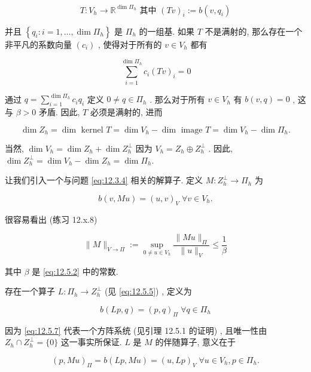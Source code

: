 $$
T : {V}_{h} \rightarrow  {\mathbb{R}}^{\dim {\varPi }_{h}}\text{ 其中 }{\left( Tv\right) }_{i}:=b\left( {v,{q}_{i}}\right)
$$

并且 $\left\{  {{q}_{i} : i = 1,\ldots ,\dim {\varPi }_{h}}\right\}$ 是 ${\varPi }_{h}$ 的一组基. 如果 $T$ 不是满射的, 那么存在一个非平凡的系数向量 $\left( {c}_{i}\right)$ , 使得对于所有的 $v \in  {V}_{h}$ 都有

$$
\sum\limits_{{i = 1}}^{{\dim {\varPi }_{h}}}{c}_{i}{\left( Tv\right) }_{i} = 0
$$

通过 $q = \sum\limits_{{i = 1}}^{{\dim {\varPi }_{h}}}{c}_{i}{q}_{i}$ 定义 $0 \neq  q \in  {\varPi }_{h}$ . 那么对于所有 $v \in  {V}_{h}$ 有 $b\left( {v,q}\right)  = 0$ , 这与 $\beta  > 0$ 矛盾. 因此, $T$ 必须是满射的, 进而

$$
\dim {Z}_{h} = \dim \text{ kernel } T = \dim {V}_{h} - \dim \text{ image } T = \dim {V}_{h} - \dim {\varPi }_{h}.
$$

当然, $\dim {V}_{h} = \dim {Z}_{h} + \dim {Z}_{h}^{ \bot  }$ 因为 ${V}_{h} = {Z}_{h} \oplus  {Z}_{h}^{ \bot  }$ . 因此, $\dim {Z}_{h}^{ \bot  } = \dim {V}_{h} - \dim {Z}_{h} = \dim {\varPi }_{h}.$

让我们引入一个与问题 \eqref{eq:12.3.4} 相关的解算子. 定义 $M : {Z}_{h}^{ \bot  } \rightarrow  {\varPi }_{h}$ 为

\begin{equation}\label{eq:12.5.6}
b\left( {v,{Mu}}\right)  = {\left( u,v\right) }_{V}\;\forall v \in  {V}_{h}.
\end{equation}

很容易看出 (练习 12.x.8) 

$$
\| M\|_{V \rightarrow  \varPi }:=\mathop{\sup }\limits_{{0 \neq  u \in  {V}_{h}}}\frac{\| {Mu}\|_{\varPi }}{\| u\|_{V}} \leq  \frac{1}{\beta }
$$

其中 $\beta$ 是 \eqref{eq:12.5.2} 中的常数.

存在一个算子 $L : {\varPi }_{h} \rightarrow  {Z}_{h}^{ \bot  }$ (见 \eqref{eq:12.5.5}) , 定义为

\begin{equation}\label{eq:12.5.7}
b\left( {{Lp},q}\right)  = {\left( p,q\right) }_{\varPi }\;\forall q \in  {\varPi }_{h}
\end{equation}

因为 \eqref{eq:12.5.7} 代表一个方阵系统 (见引理 12.5.1 的证明) , 且唯一性由 ${Z}_{h} \cap  {Z}_{h}^{ \bot  } = \{ 0\}$ 这一事实所保证. $L$ 是 $M$ 的伴随算子, 意义在于

\begin{equation}\label{eq:12.5.8}
{\left( p,Mu\right) }_{\varPi } = b\left( {{Lp},{Mu}}\right)  = {\left( u,Lp\right) }_{V}\;\forall u \in  {V}_{h},p \in  {\varPi }_{h}.
\end{equation}

